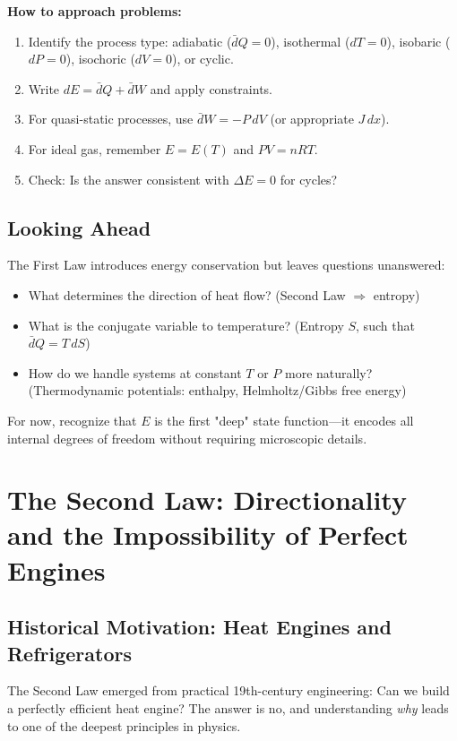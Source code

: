 \documentclass[9pt,twocoloumn]{article}
\begin{document}
\textbf{How to approach problems:}
\begin{enumerate}
    \item Identify the process type: adiabatic ($\bar{d}Q = 0$), isothermal ($dT = 0$), isobaric ($dP = 0$), isochoric ($dV = 0$), or cyclic.
    \item Write $dE = \bar{d}Q + \bar{d}W$ and apply constraints.
    \item For quasi-static processes, use $\bar{d}W = -P \, dV$ (or appropriate $J \, dx$).
    \item For ideal gas, remember $E = E(T)$ and $PV = nRT$.
    \item Check: Is the answer consistent with $\Delta E = 0$ for cycles?
\end{enumerate}

\subsection{Looking Ahead}
The First Law introduces energy conservation but leaves questions unanswered:
\begin{itemize}
    \item What determines the direction of heat flow? (Second Law $\Rightarrow$ entropy)
    \item What is the conjugate variable to temperature? (Entropy $S$, such that $\bar{d}Q = T \, dS$)
    \item How do we handle systems at constant $T$ or $P$ more naturally? (Thermodynamic potentials: enthalpy, Helmholtz/Gibbs free energy)
\end{itemize}

For now, recognize that $E$ is the first "deep" state function—it encodes all internal degrees of freedom without requiring microscopic details.

\section{The Second Law: Directionality and the Impossibility of Perfect Engines}

\subsection{Historical Motivation: Heat Engines and Refrigerators}
The Second Law emerged from practical 19th-century engineering: Can we build a perfectly efficient heat engine? The answer is no, and understanding \emph{why} leads to one of the deepest principles in physics.
\end{document}
